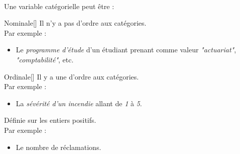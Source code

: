 \documentclass[10pt, french]{article}
\begin{document}
\begin{multicols*}{2}
\begin{definitionNOHFILLpropos}
\

Une variable catégorielle peut être :
\begin{definitionGENERAL}{Nominale}[]
Il n'y a pas d'ordre aux catégories.\\

Par exemple :
\begin{itemize}
	\item	Le \textit{programme d'étude} d'un étudiant prenant comme valeur \textit{"actuariat"}, \textit{"comptabilité"}, etc.
\end{itemize}
\end{definitionGENERAL}
\begin{definitionGENERAL}{Ordinale}[]
Il y a une d'ordre aux catégories.\\

Par exemple :
\begin{itemize}                                           
	\item	La \textit{sévérité d'un incendie} allant de \textit{1} à \textit{5}.
\end{itemize}    
\end{definitionGENERAL}
\end{definitionNOHFILLpropos}

\begin{definitionNOHFILLpropos}
Définie sur les entiers positifs.	\\

Par exemple :
\begin{itemize}
	\item	Le nombre de réclamations.
\end{itemize}
\end{definitionNOHFILLpropos}


%
%
%	
%


\end{multicols*}
\end{document}
